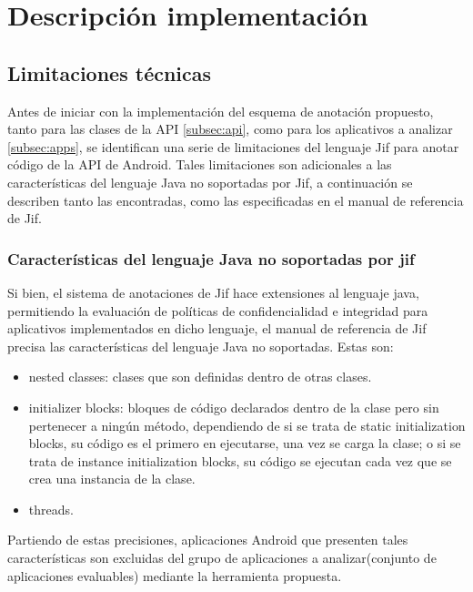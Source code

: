 \chapter{Descripción implementación}

\section{Limitaciones técnicas}
\label{sec:limitaciones-tec}
Antes de iniciar con la implementación del esquema de anotación propuesto, tanto
para las clases de la API \ref{subsec:api}, como para los aplicativos a analizar
\ref{subsec:apps}, se identifican una serie de limitaciones del lenguaje
Jif para anotar código de la API de Android. 
Tales limitaciones son adicionales a las características del lenguaje Java no
soportadas por Jif, a continuación se describen tanto las encontradas, como las
especificadas en el manual de referencia de Jif.

\subsection{Características del lenguaje Java no soportadas por jif}
Si bien, el sistema de anotaciones de Jif hace extensiones al lenguaje java,
permitiendo la evaluación de políticas de confidencialidad e integridad para
aplicativos implementados en dicho lenguaje, el manual de referencia de Jif
precisa las características del lenguaje Java no soportadas\cite{jifRef}. Estas
son:
\begin{itemize}
  \item nested classes: clases que son definidas dentro de otras clases.
  \item initializer blocks: bloques de código declarados dentro de la clase pero
  sin pertenecer a ningún método, dependiendo de si se trata de static
  initialization blocks, su código es el primero en ejecutarse, una vez se
  carga la clase; o si se trata de instance initialization blocks, su código se
  ejecutan cada vez que se crea una instancia de la clase.
\item threads.
\end{itemize} 
Partiendo de estas precisiones, aplicaciones Android que presenten tales
características son excluidas del grupo de aplicaciones a analizar(conjunto de
aplicaciones evaluables) mediante la herramienta propuesta.

